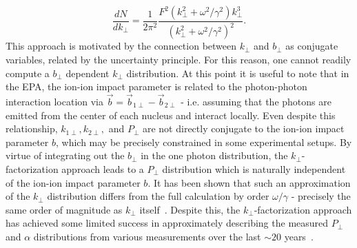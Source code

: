 \documentclass[12pt,epjc3]{svjour3}\sloppy
\begin{document}
\begin{equation}
    \frac{dN}{dk_\perp} = \frac{1}{2\pi^2} \frac{F^2(k_\perp^2 + \omega^2/\gamma^2) k_\perp^3}{(k_\perp^2 + \omega^2/\gamma^2)^2}.
    \label{eq:ktfactorization}
\end{equation}
This approach is motivated by the connection between $k_\perp$ and $b_\perp$ as conjugate variables, related by the uncertainty principle\cite{heisenbergUeberAnschaulichenInhalt1927}. For this reason, one cannot readily compute a $b_\perp$ dependent $k_\perp$ distribution. 
At this point it is useful to note that in the EPA, the ion-ion impact parameter is related to the photon-photon interaction location via $\vec{b} = \vec{b}_{1\perp} - \vec{b}_{2\perp}$ - i.e. assuming that the photons are emitted from the center of each nucleus and interact locally.
Even despite this relationship, $k_{1\perp}, k_{2\perp},$ and $P_\perp$ are not directly conjugate to the ion-ion impact parameter $b$, which may be precisely constrained in some experimental setups. 
By virtue of integrating out the $b_{\perp}$ in the one photon distribution, the $k_\perp$-factorization approach leads to a $P_\perp$ distribution which is naturally independent of the ion-ion impact parameter $b$.
It has been shown that such an approximation of the $k_\perp$ distribution differs from the full calculation by order $\omega/\gamma$ - precisely the same order of magnitude as $k_\perp$ itself~\cite{PhysRevC.47.2308,henckenImpactparameterDependenceTotal1995}.
Despite this, the $k_\perp$-factorization approach has achieved some limited success in approximately describing the measured $P_\perp$ and $\alpha$ distributions from various measurements over the last $\sim20$ years~\cite{starcollaborationProductionEnsuremathPairs2004,atlas_collaboration_evidence_2017,atlas_collaboration_observation_2019,atlascollaborationExclusiveDimuonProduction2020,abbasCharmoniumPairPhotoproduction2013a,alicecollaborationMeasurementExcessYield2016b}. 
\end{document}
